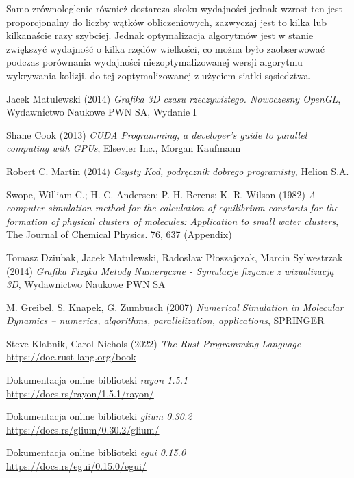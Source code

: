 \documentclass[12pt, letterpaper]{report}
\begin{document}
    Samo zrównoleglenie również dostarcza skoku wydajności jednak wzrost ten jest proporcjonalny do liczby wątków obliczeniowych,
    zazwyczaj jest to kilka lub kilkanaście razy szybciej. Jednak optymalizacja algorytmów jest w stanie 
    zwiększyć wydajność o kilka rzędów wielkości, co można było zaobserwować podczas porównania wydajności 
    niezoptymalizowanej wersji algorytmu wykrywania kolizji, do tej zoptymalizowanej z użyciem siatki sąsiedztwa.

    \begin{thebibliography}{9}

        Jacek Matulewski (2014) 
        \emph{Grafika 3D czasu rzeczywistego. Nowoczesny OpenGL},
        Wydawnictwo Naukowe PWN SA, Wydanie I

        Shane Cook (2013) 
        \emph{CUDA Programming, a developer's guide to parallel computing with GPUs},
        Elsevier Inc., Morgan Kaufmann

        Robert C. Martin (2014) 
        \emph{Czysty Kod, podręcznik dobrego programisty},
        Helion S.A.

        Swope, William C.; H. C. Andersen; P. H. Berens; K. R. Wilson (1982) 
        \emph{A computer simulation method for the calculation of 
            equilibrium constants for the formation of physical clusters 
            of molecules: Application to small water clusters}, 
        The Journal of Chemical Physics. 76, 637 (Appendix)

        Tomasz Dziubak, Jacek Matulewski, Radosław Płoszajczak, Marcin Sylwestrzak (2014)
        \emph{Grafika Fizyka Metody Numeryczne - Symulacje fizyczne z wizualizacją 3D},
        Wydawnictwo Naukowe PWN SA

        M. Greibel, S. Knapek, G. Zumbusch (2007)
        \emph{
            Numerical Simulation in Molecular Dynamics – 
            numerics, algorithms, parallelization, applications},
        SPRINGER

        Steve Klabnik, Carol Nichols (2022)
        \emph{The Rust Programming Language} \\
        \url{https://doc.rust-lang.org/book}

        Dokumentacja online biblioteki \emph{rayon 1.5.1} \\
        \url{https://docs.rs/rayon/1.5.1/rayon/}

        Dokumentacja online biblioteki \emph{glium 0.30.2} \\
        \url{https://docs.rs/glium/0.30.2/glium/}

        Dokumentacja online biblioteki \emph{egui 0.15.0} \\
        \url{https://docs.rs/egui/0.15.0/egui/}

    \end{thebibliography}
\end{document}

